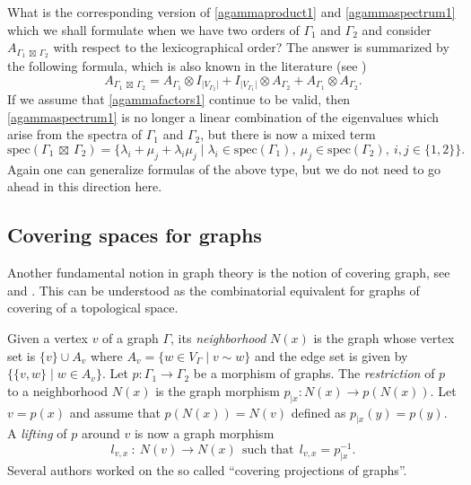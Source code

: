 \documentclass{amsart}
\newtheorem{defn}[theo]{Definition}
\theoremstyle{definition}
\numberwithin{equation}{section}
\begin{document}
What is the corresponding version of \eqref{agammaproduct1} and \eqref{agammaspectrum1} which we shall formulate when we have two orders of $\Gamma_1$ and $\Gamma_2$ and consider
 $A_{\Gamma_1  \ \boxtimes \  \Gamma_2}$  with respect to the lexicographical order? The answer is summarized by the following formula, which is also known in the literature (see \cite{spectrabook, crs})
\begin{equation}\label{agammaproduct2}
A_{\Gamma_1 \ \boxtimes \ \Gamma_2} = A_{\Gamma_1} \otimes I_{\vert V_{\Gamma_2}\vert} + I_{\vert V_{\Gamma_1}\vert}\otimes A_{\Gamma_2} + A_{\Gamma_1}\otimes A_{\Gamma_2}.
\end{equation}
If we assume that \eqref{agammafactors1} continue to be valid, then \eqref{agammaspectrum1} is no longer a linear combination of the eigenvalues which arise from the spectra of $\Gamma_1$ and $\Gamma_2$, but there is now a mixed term 
\begin{equation}\label{agammaspectrum2}
\mathrm{spec}(\Gamma_1 \   \boxtimes  \ \Gamma_2) = \{  \lambda_i + \mu_j +  \lambda_i\mu_j \mid  \lambda_i \in \mathrm{spec}(\Gamma_1), \  \mu_j \in \mathrm{spec}(\Gamma_2), \ i,j \in \{1, 2\}\}.\end{equation}
Again one can generalize formulas of the above type, but we do not need to go ahead in this direction here. 

\subsection{Covering spaces for graphs} Another fundamental notion in graph theory is the notion of covering graph, see \cite[\S 6.4, \S 14.2.4]{spectrabook} and \cite{gross2}. This can be understood as the combinatorial equivalent for graphs of covering of a topological space. 


Given a vertex $v$ of a graph $\Gamma$, its \textit{neighborhood} $N(x)$ is the graph whose vertex set is $\{v\} \cup A_v$ where $A_v = \{w \in V_\Gamma \mid v \sim w\}$ and the edge set is given by $\{\{v, w\} \mid w \in A_v\}$. Let $p: \Gamma_1 \longrightarrow \Gamma_2$ be a morphism of graphs. The \textit{restriction} of $p$ to a neighborhood $N(x)$ is the graph morphism $p_{\vert x}: N(x) \longrightarrow p(N(x))$. Let $v = p(x)$ and assume that $p(N(x)) = N(v)$ defined as $p_{\vert x}(y) = p(y)$. A \textit{lifting} of $p$ around $v$ is now a graph morphism \begin{equation} l_{v,x} \ : \  N(v) \longrightarrow N(x) \ \ \mbox{such that} \ \ l_{v,x} = p_{\vert x}^{-1}.\end{equation}
Several authors \cite{clarke, spectrabook, crs, gross2} worked on the so called ``covering projections of graphs''.
\end{document}
